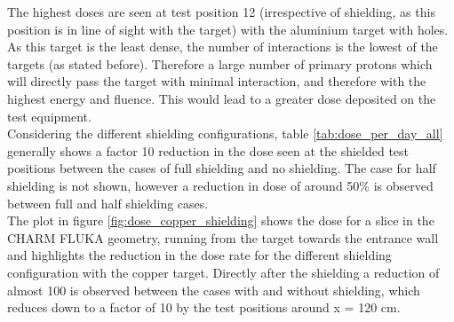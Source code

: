 The highest doses are seen at test position 12 (irrespective of shielding, as this position is in line of sight with the target) with the aluminium target with holes. As this target is the least dense, the number of interactions is the lowest of the targets (as stated before). Therefore a large number of primary protons which will directly pass the target with minimal interaction, and therefore with the highest energy and fluence. This would lead to a greater dose deposited on the test equipment. \\

Considering the different shielding configurations, table \ref{tab:dose_per_day_all} generally shows a factor 10 reduction in the dose seen at the shielded test positions between the cases of full shielding and no shielding. The case for half shielding is not shown, however a reduction in dose of around 50\% is observed between full and half shielding cases. \\

The plot in figure \ref{fig:dose_copper_shielding} shows the dose for a slice in the CHARM FLUKA geometry, running from the target towards the entrance wall and highlights the reduction in the dose rate for the different shielding configuration with the copper target. Directly after the shielding a reduction of almost 100 is observed between the cases with and without shielding, which reduces down to a factor of 10 by the test positions around x = 120 cm. \\

